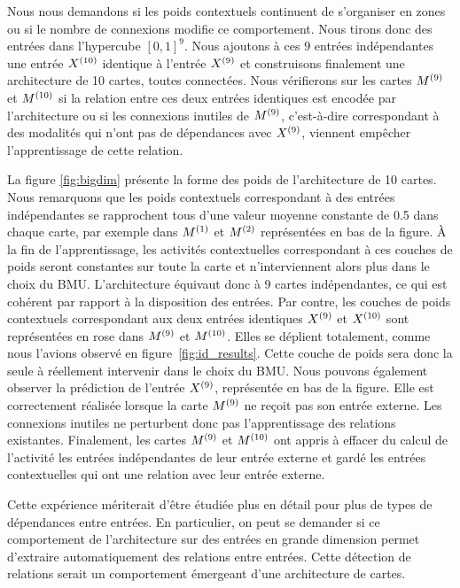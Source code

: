 \documentclass[../main]{subfiles}
\begin{document}
Nous nous demandons si les poids contextuels continuent de s'organiser en zones ou si le nombre de connexions modifie ce comportement. Nous tirons donc des entrées dans l'hypercube $[0,1]^9$. 
Nous ajoutons à ces $9$ entrées indépendantes une entrée $X^{({10})}$ identique à l'entrée $X^{({9})}$ et construisons finalement une architecture de 10 cartes, toutes connectées.
Nous vérifierons sur les cartes $M^{({9})}$ et $M^{({10})}$ si la relation entre ces deux entrées identiques est encodée par l'architecture ou si les connexions \og inutiles \fg{} de $M^{({9})}$, c'est-à-dire correspondant à des modalités qui n'ont pas de dépendances avec $X^{({9})}$, viennent empêcher l'apprentissage de cette relation.

La figure \ref{fig:bigdim} présente la forme des poids de l'architecture de 10 cartes.
Nous remarquons que les poids contextuels correspondant à des entrées indépendantes se rapprochent tous d'une valeur moyenne constante de 0.5 dans chaque carte, par exemple dans $M^{({1})}$ et $M^{({2})}$ représentées en bas de la figure.
\`A la fin de l'apprentissage, les activités contextuelles correspondant à ces couches de poids seront constantes sur toute la carte et n'interviennent alors plus dans le choix du BMU.
L'architecture équivaut donc à 9 cartes indépendantes, ce qui est cohérent par rapport à la disposition des entrées. 
Par contre, les couches de poids contextuels correspondant aux deux entrées identiques $X^{({9})}$ et $X^{({10})}$ sont représentées en rose dans $M^{({9})}$ et $M^{({10})}$. 
Elles se déplient totalement, comme nous l'avions observé en figure~\ref{fig:id_results}. Cette couche de poids sera donc la seule à réellement intervenir dans le choix du BMU.
Nous pouvons également observer la prédiction de l'entrée $X^{({9})}$, représentée en bas de la figure. Elle est correctement réalisée lorsque la carte $M^{({9})}$ ne reçoit pas son entrée externe. Les connexions \og inutiles \fg{} ne perturbent donc pas l'apprentissage des relations existantes. 
Finalement, les cartes $M^{({9})}$ et $M^{({10})}$ ont appris à effacer du calcul de l'activité les entrées indépendantes de leur entrée externe et gardé les entrées contextuelles qui ont une relation avec leur entrée externe.

Cette expérience mériterait d'être étudiée plus en détail pour plus de types de dépendances entre entrées. 
En particulier, on peut se demander si ce comportement de l'architecture sur des entrées en grande dimension permet d'extraire automatiquement des relations entre entrées. 
Cette détection de relations serait un comportement émergeant d'une architecture de cartes.
\end{document}
